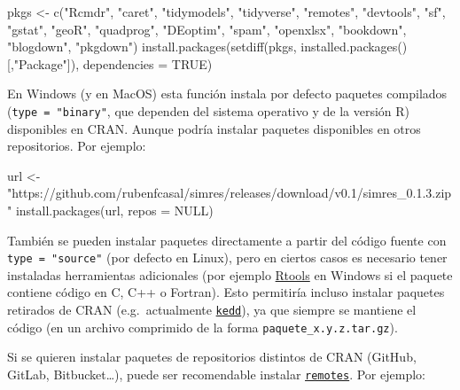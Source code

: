 \documentclass[
]{book}
\newenvironment{Shaded}{\begin{snugshade}}{\end{snugshade}}
\newcommand{\AttributeTok}[1]{\textcolor[rgb]{0.77,0.63,0.00}{#1}}
\newcommand{\ConstantTok}[1]{\textcolor[rgb]{0.00,0.00,0.00}{#1}}
\newcommand{\FunctionTok}[1]{\textcolor[rgb]{0.00,0.00,0.00}{#1}}
\newcommand{\NormalTok}[1]{#1}
\newcommand{\OtherTok}[1]{\textcolor[rgb]{0.56,0.35,0.01}{#1}}
\newcommand{\StringTok}[1]{\textcolor[rgb]{0.31,0.60,0.02}{#1}}
\theoremstyle{break}
\theoremstyle{nonumberplain}
\begin{document}
\begin{Shaded}
\begin{Highlighting}[]
\NormalTok{pkgs }\OtherTok{\textless{}{-}} \FunctionTok{c}\NormalTok{(}\StringTok{"Rcmdr"}\NormalTok{, }\StringTok{"caret"}\NormalTok{, }\StringTok{"tidymodels"}\NormalTok{, }\StringTok{"tidyverse"}\NormalTok{, }\StringTok{"remotes"}\NormalTok{, }\StringTok{"devtools"}\NormalTok{,}
          \StringTok{"sf"}\NormalTok{, }\StringTok{"gstat"}\NormalTok{, }\StringTok{"geoR"}\NormalTok{, }\StringTok{"quadprog"}\NormalTok{, }\StringTok{"DEoptim"}\NormalTok{, }\StringTok{"spam"}\NormalTok{, }\StringTok{"openxlsx"}\NormalTok{,}
            \StringTok{"bookdown"}\NormalTok{, }\StringTok{"blogdown"}\NormalTok{, }\StringTok{"pkgdown"}\NormalTok{)}
\FunctionTok{install.packages}\NormalTok{(}\FunctionTok{setdiff}\NormalTok{(pkgs, }\FunctionTok{installed.packages}\NormalTok{()[,}\StringTok{"Package"}\NormalTok{]), }\AttributeTok{dependencies =} \ConstantTok{TRUE}\NormalTok{)}
\end{Highlighting}
\end{Shaded}

En Windows (y en MacOS) esta función instala por defecto paquetes compilados (\texttt{type\ =\ "binary"}, que dependen del sistema operativo y de la versión R) disponibles en CRAN.
Aunque podría instalar paquetes disponibles en otros repositorios.
Por ejemplo:

\begin{Shaded}
\begin{Highlighting}[]
\NormalTok{url }\OtherTok{\textless{}{-}} \StringTok{"https://github.com/rubenfcasal/simres/releases/download/v0.1/simres\_0.1.3.zip"}
\FunctionTok{install.packages}\NormalTok{(url, }\AttributeTok{repos =} \ConstantTok{NULL}\NormalTok{)}
\end{Highlighting}
\end{Shaded}

También se pueden instalar paquetes directamente a partir del código fuente con \texttt{type\ =\ "source"} (por defecto en Linux), pero en ciertos casos es necesario tener instaladas herramientas adicionales (por ejemplo \href{https://cran.r-project.org/bin/windows/Rtools}{Rtools} en Windows si el paquete contiene código en C, C++ o Fortran).
Esto permitiría incluso instalar paquetes retirados de CRAN (e.g.~actualmente \href{https://CRAN.R-project.org/package=kedd}{\texttt{kedd}}), ya que siempre se mantiene el código (en un archivo comprimido de la forma \texttt{paquete\_x.y.z.tar.gz}).

Si se quieren instalar paquetes de repositorios distintos de CRAN (GitHub, GitLab, Bitbucket\ldots), puede ser recomendable instalar \href{https://remotes.r-lib.org/}{\texttt{remotes}}.
Por ejemplo:
\end{document}
